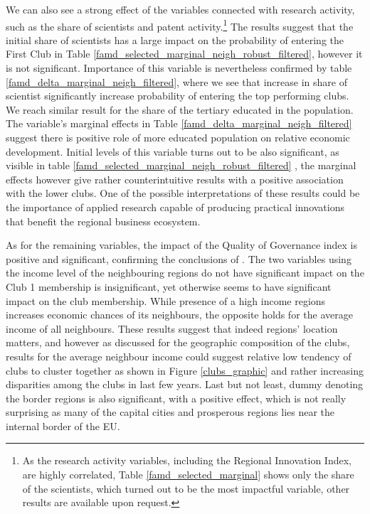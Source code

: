 \documentclass[11pt]{article}
\begin{document}
We can also see a strong effect of the variables connected with research activity, such as the share of scientists and patent activity.\footnote{As the research activity variables, including the Regional Innovation Index, are highly correlated, Table \ref{famd_selected_marginal} shows only the share of the scientists, which turned out to be the most impactful variable, other results are available upon request.} The results suggest that the initial share of scientists has a large impact on the probability of entering the First Club in Table \ref{famd_selected_marginal_neigh_robust_filtered}, however it is not significant. Importance of this variable is nevertheless confirmed by table \ref{famd_delta_marginal_neigh_filtered},  where we see that increase in share of scientist significantly increase probability of entering the top performing clubs. We reach similar result for the share of the tertiary educated in the population. The variable's marginal effects in Table \ref{famd_delta_marginal_neigh_filtered}  suggest there is positive role of more educated population on relative economic development.  Initial levels of this variable turns out to be also significant, as visible in table \ref{famd_selected_marginal_neigh_robust_filtered}  , the marginal effects however give rather counterintuitive results with a positive association with the lower clubs. One of the possible interpretations of these results could be the importance of applied research capable of producing practical innovations that benefit the regional business ecosystem.

As for the remaining variables, the impact of the Quality of Governance index is positive and significant, confirming the conclusions of \citet{rodriguez2020institutional} . The two variables using the income level of the neighbouring regions do not have significant impact on the Club 1 membership is insignificant, yet otherwise seems to have significant impact on the club membership. While presence of a high income regions increases economic chances of its neighbours, the opposite holds for the average income of all neighbours. These results suggest that indeed regions' location matters, and however as discussed for the geographic composition of the clubs, results for the average neighbour income could suggest relative low tendency of clubs to cluster together as shown in Figure \ref{clubs_graphic}  and rather increasing disparities among the clubs in last few years. Last but not least, dummy denoting the border regions is also significant, with a positive effect, which is not really surprising as many of the capital cities and prosperous regions lies near the internal border of the EU.
\end{document}
